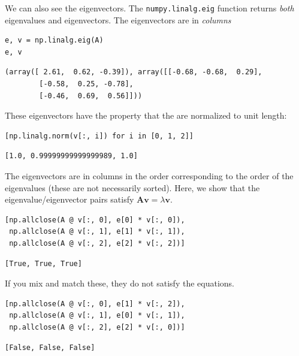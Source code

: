 \documentclass[11pt]{article}
\begin{document}
We can also see the eigenvectors. The \texttt{numpy.linalg.eig} function returns \emph{both} eigenvalues and eigenvectors. The eigenvectors are in \emph{columns}

\begin{verbatim}
e, v = np.linalg.eig(A)
e, v
\end{verbatim}

\begin{verbatim}
(array([ 2.61,  0.62, -0.39]), array([[-0.68, -0.68,  0.29],
        [-0.58,  0.25, -0.78],
        [-0.46,  0.69,  0.56]]))
\end{verbatim}

These eigenvectors have the property that the are normalized to unit length:

\begin{verbatim}
[np.linalg.norm(v[:, i]) for i in [0, 1, 2]]
\end{verbatim}

\begin{verbatim}
[1.0, 0.99999999999999989, 1.0]
\end{verbatim}

The eigenvectors are in columns in the order corresponding to the order of the eigenvalues (these are not necessarily sorted). Here, we show that the eigenvalue/eigenvector pairs satisfy \(\mathbf{A} \mathbf{v} = \lambda \mathbf{v}\).

\begin{verbatim}
[np.allclose(A @ v[:, 0], e[0] * v[:, 0]),
 np.allclose(A @ v[:, 1], e[1] * v[:, 1]),
 np.allclose(A @ v[:, 2], e[2] * v[:, 2])]
\end{verbatim}

\begin{verbatim}
[True, True, True]
\end{verbatim}

If you mix and match these, they do not satisfy the equations.

\begin{verbatim}
[np.allclose(A @ v[:, 0], e[1] * v[:, 2]),
 np.allclose(A @ v[:, 1], e[0] * v[:, 1]),
 np.allclose(A @ v[:, 2], e[2] * v[:, 0])]
\end{verbatim}

\begin{verbatim}
[False, False, False]
\end{verbatim}
\end{document}
